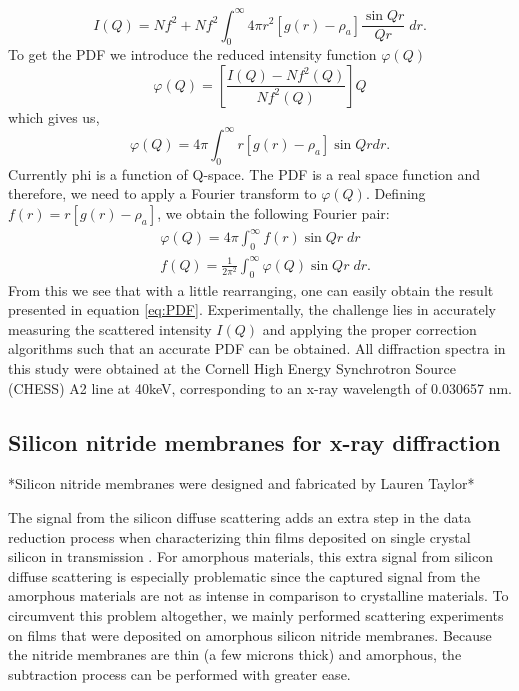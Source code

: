 \begin{equation}\label{eq:Ic5}
I(Q) = Nf^{2}+ Nf^{2}\int^{\infty}_{0} 4\pi r^{2}[g(r) - \rho_{a}] \frac{\sin{Qr}}{Qr}\;dr.
\end{equation} 
To get the PDF we introduce the reduced intensity function $\varphi(Q)$
\begin{equation}\label{eq:RIF}
\varphi(Q) = \left[\frac{I(Q) - Nf^{2}(Q)}{Nf^{2}(Q)}\right]Q
\end{equation}
which gives us, 
\begin{equation}\label{eq:phi}
\varphi(Q) = 4\pi\int^{\infty}_{0}  r[g(r) - \rho_{a}] \sin{Qr}dr.
\end{equation}
Currently phi is a function of Q-space. The PDF is a real space function and therefore, we need to apply a Fourier transform to $\varphi(Q)$. Defining $f(r) =  r[g(r) - \rho_{a}]$, we obtain the following Fourier pair:
\begin{equation}\label{eq:pair}
\begin{split}
 & \varphi(Q) = 4\pi\int^{\infty}_{0} f(r) \sin{Qr}\;dr\\
 & f(Q) = \frac{1}{2\pi^{2}}\int^{\infty}_{0} \varphi(Q) \sin{Qr}\;dr.
\end{split}
\end{equation}
From this we see that with a little rearranging, one can easily obtain the result presented in equation \ref{eq:PDF}.
Experimentally, the challenge lies in accurately measuring the scattered intensity $I(Q)$ and applying the proper correction algorithms such that an accurate PDF can be obtained. All diffraction spectra in this study were obtained at the Cornell High Energy Synchrotron Source (CHESS) A2 line at 40keV, corresponding to an x-ray wavelength of 0.030657 nm.

\subsection{Silicon nitride membranes for x-ray diffraction}

*Silicon nitride membranes were designed and fabricated by Lauren Taylor*

\noindent The signal from the silicon diffuse scattering adds an extra step in the data reduction process when characterizing thin films deposited on single crystal silicon in transmission \cite{Gregoire2009a}. For amorphous materials, this extra signal from silicon diffuse scattering is especially problematic since the captured signal from the amorphous materials are not as intense in comparison to crystalline materials. To circumvent this problem altogether, we mainly performed scattering experiments on films that were deposited on amorphous silicon nitride membranes. Because the nitride membranes are thin (a few microns thick) and amorphous, the subtraction process can be performed with greater ease.

